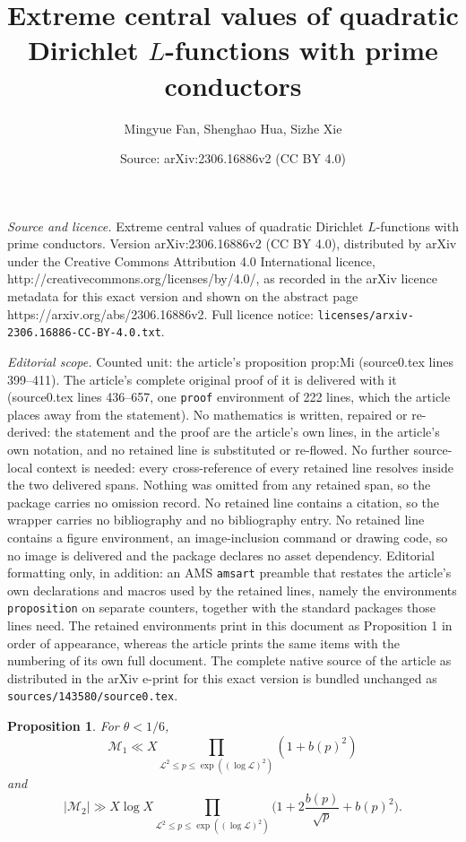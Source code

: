 \documentclass[10pt,a4paper]{amsart}
\title{Extreme central values of quadratic Dirichlet $L$-functions with prime conductors}
\author{Mingyue Fan, Shenghao Hua, Sizhe Xie}
\date{Source: arXiv:2306.16886v2 (CC BY 4.0)}
\newtheorem{proposition}{Proposition}
\begin{document}
\maketitle

\noindent\emph{Source and licence.} Extreme central values of quadratic Dirichlet $L$-functions with prime conductors. Version arXiv:2306.16886v2 (CC BY 4.0), distributed by arXiv under the Creative Commons Attribution 4.0 International licence, http://creativecommons.org/licenses/by/4.0/, as recorded in the arXiv licence metadata for this exact version and shown on the abstract page https://arxiv.org/abs/2306.16886v2. Full licence notice: \texttt{licenses/arxiv-2306.16886-CC-BY-4.0.txt}.\par\smallskip

\noindent\textit{Editorial scope.} Counted unit: the article's proposition prop:Mi (source0.tex lines 399--411). The article's complete original proof of it is delivered with it (source0.tex lines 436--657, one \texttt{proof} environment of 222 lines, which the article places away from the statement). No mathematics is written, repaired or re-derived: the statement and the proof are the article's own lines, in the article's own notation, and no retained line is substituted or re-flowed.  No further source-local context is needed: every cross-reference of every retained line resolves inside the two delivered spans.  Nothing was omitted from any retained span, so the package carries no omission record.  No retained line contains a citation, so the wrapper carries no bibliography and no bibliography entry.  No retained line contains a figure environment, an image-inclusion command or drawing code, so no image is delivered and the package declares no asset dependency.  Editorial formatting only, in addition: an AMS \texttt{amsart} preamble that restates the article's own declarations and macros used by the retained lines, namely the environments \texttt{proposition} on separate counters, together with the standard packages those lines need.  The retained environments print in this document as Proposition 1 in order of appearance, whereas the article prints the same items with the numbering of its own full document.  The complete native source of the article as distributed in the arXiv e-print for this exact version is bundled unchanged as \texttt{sources/143580/source0.tex}.
\begin{proposition}\label{prop:Mi}
For $\theta< 1/6$,
  \begin{equation*}
  \mathcal{M}_1\ll X\prod_{\mathcal{L}^2\leq p \leq \exp((\log \mathcal{L})^2)}
(1+ b(p)^2)
\end{equation*}
and
\begin{equation*}
   |\mathcal{M}_2|\gg
   X\log X \prod_{\mathcal{L}^2\leq p \leq \exp((\log \mathcal{L})^2)}
  \bigg(1+2\frac{b(p)}{\sqrt{p}}+b(p)^2\bigg).
\end{equation*}
\end{proposition}
\end{document}
